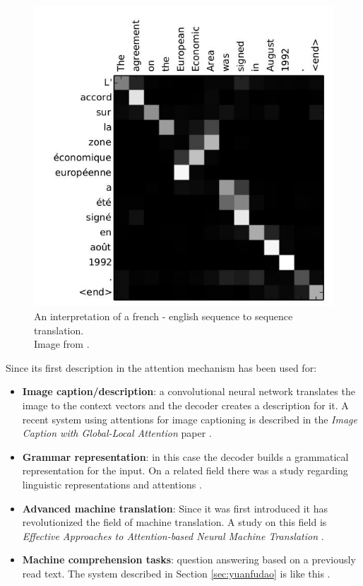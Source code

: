 \begin{figure}[!htb]
	\centering
	\includegraphics[scale=0.5]{figures/interpretation.jpg}
	\caption{An interpretation of a french - english sequence to sequence translation.\\Image from \cite{Bahdanau:2015}.}
	\label{fig:interpretation}
\end{figure}

\begin{minipage}{\linewidth}
	Since its first description in \cite{Bahdanau:2015} the attention mechanism has been used for:
	\begin{itemize}
		\item \textbf{Image caption/description}: a convolutional neural network translates the image to the context vectors and the decoder creates a description for it. A recent system using attentions for image captioning is described in the \textit{Image Caption with Global-Local Attention} paper \cite{Li:2017c}.
		\item \textbf{Grammar representation}: in this case the decoder builds a grammatical representation for the input. On a related field there was a study regarding linguistic representations and attentions \cite{Kadar:2016}.
		\item \textbf{Advanced machine translation}: Since it was first introduced it has revolutionized the field of machine translation. A study on this field is \textit{Effective Approaches to Attention-based Neural Machine Translation} \cite{Luong:2015b}.
		\item \textbf{Machine comprehension tasks}: question answering based on a previously read text. The system described in Section \ref{sec:yuanfudao} is like this \cite{Wang:2018}.
	\end{itemize}
\end{minipage}
